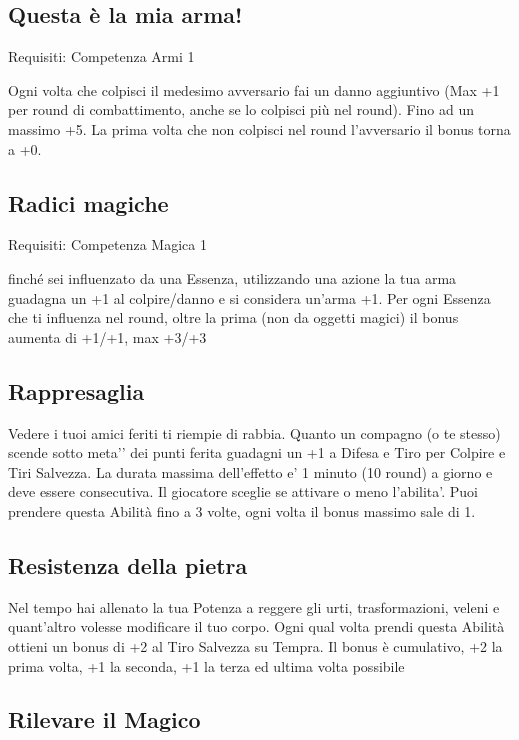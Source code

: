 \documentclass[a4paper,11pt,twoside,openany]{book}
\begin{document}
\subsection{Questa è la mia arma!}

Requisiti: Competenza Armi 1

Ogni volta che colpisci il medesimo avversario fai un danno aggiuntivo (Max +1 per round di combattimento, anche se lo colpisci più nel round). Fino ad un massimo +5. La prima volta che non colpisci nel round l'avversario il bonus torna a +0.

\subsection{Radici magiche}

Requisiti: Competenza Magica 1

finché sei influenzato da una Essenza, utilizzando una azione la tua arma guadagna un +1 al colpire/danno e si considera un'arma +1. Per ogni Essenza che ti influenza nel round, oltre la prima (non da oggetti magici) il bonus aumenta di +1/+1, max +3/+3

\subsection{Rappresaglia}

Vedere i tuoi amici feriti ti riempie di rabbia.
Quanto un compagno (o te stesso) scende sotto meta'’ dei punti ferita guadagni un +1 a Difesa e Tiro per Colpire e Tiri Salvezza. La durata massima dell’effetto e’ 1 minuto (10 round) a giorno e deve essere consecutiva. Il giocatore sceglie se attivare o meno l’abilita’.
Puoi prendere questa Abilità fino a 3 volte, ogni volta il bonus massimo sale di 1.

\subsection{Resistenza della pietra}

Nel tempo hai allenato la tua Potenza a reggere gli urti, trasformazioni, veleni e quant'altro volesse modificare il tuo corpo. Ogni qual volta prendi questa Abilità ottieni un bonus di +2 al Tiro Salvezza su Tempra. Il bonus è cumulativo, +2 la prima volta, +1 la seconda, +1 la terza ed ultima volta possibile

\subsection{Rilevare il Magico}
\end{document}

